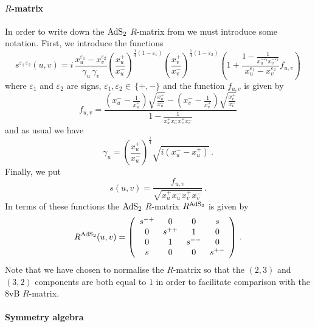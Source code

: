 \documentclass[12pt,a4paper]{article}
\numberwithin{equation}{section}
\begin{document}
\paragraph{$R$-matrix} In order to write down the ${\rm AdS}_{2}$ $R$-matrix from  \cite{Hoare:2014kma}
 we must introduce some notation. First, we introduce the functions
\begin{equation}
s^{\varepsilon_1\, \varepsilon_2}(u,v)=i\, \frac{x_u^{\varepsilon_1}-x_v^{\varepsilon_2}}{\gamma_u\,\gamma_v}\left(\frac{x^+_u}{x^-_u}\right)^{\frac{1}{4}(1-\varepsilon_1)}\left(\frac{x^+_v}{x^-_v}\right)^{\frac{1}{4}(1-\varepsilon_2)}\left(1+ \frac{1-\frac{1}{x^{-\varepsilon_1}_u x^{-\varepsilon_2}_v}}{x_u^{\varepsilon_1}-x_v^{\varepsilon_2}}f_{u,v} \right)
\end{equation}
where $\varepsilon_1$ and $\varepsilon_2$ are signs, $\varepsilon_1,\varepsilon_2 \in\, \{+,-\}$ and the function $f_{u,v}$ is given by 
\begin{equation}
f_{u,v}=\frac{\left(x^-_u - \frac{1}{x^+_u}\right)\sqrt{\frac{x^+_u}{x^-_u}}-\left(x^-_v - \frac{1}{x^+_v}\right)\sqrt{\frac{x^+_v}{x^-_v}}}{1-\frac{1}{x^+_u x^-_u x^+_v x^-_v}}
\end{equation}
and as usual we have 
\begin{equation}
\gamma_u =\left(\frac{x^+_u}{x^-_u} \right)^{\frac{1}{4}}\sqrt{i\left(x^-_u-x^+_u\right)}\,.
\end{equation} 
Finally, we put 
\begin{equation}
s(u,v) = \frac{f_{u,v}}{\sqrt{x^+_u x^-_u x^+_v x^-_v}}\,.
\end{equation}
In terms of these functions the ${\rm AdS}_{2}$ $R$-matrix $R^{{\rm AdS}_{2}}$ is given by 
\begin{equation}
R^{{\rm AdS}_2}(u,v)=\left( 
\begin{array}{cccc}
s^{-+} & 0 & 0 & s \\
0 & s^{++} & 1 & 0 \\
0 & 1 & s^{--} & 0 \\
s & 0 & 0 & s^{+-}
\end{array}
\right)\,.
\end{equation}
Note that we have chosen to normalise the $R$-matrix so that the $(2,3)$ and $(3,2)$ components are both equal to $1$ in order to facilitate comparison with the 8vB $R$-matrix. 

\paragraph{Symmetry algebra}
\end{document}
